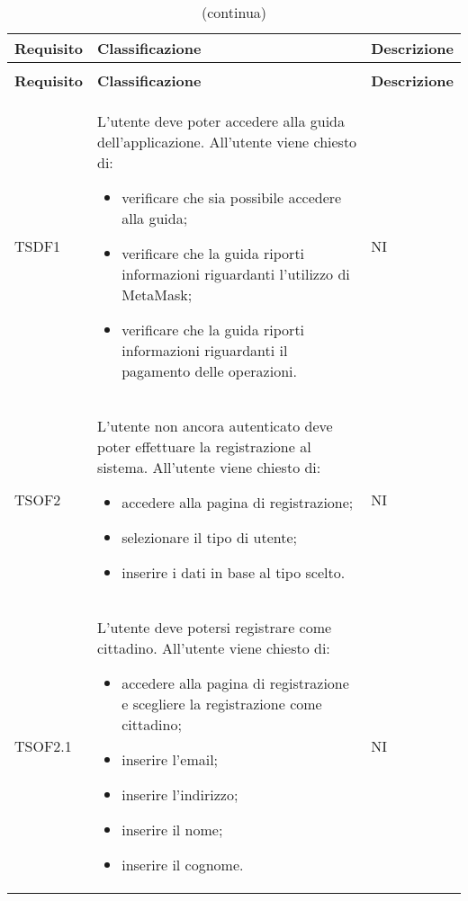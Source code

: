 	\begin{longtable}{ >{\centering}p{} >{\centering}p{}
			>{\centering}p{}}%
			
		\caption{Riepilogo Test di Accettazione}\\	
		\rowcolorhead
		\textbf{\color{white}Requisito} 
		& \textbf{\color{white}Classificazione} 
		& \centering\textbf{\color{white}Descrizione}
		\tabularnewline %
		\endfirsthead	
		
		\rowcolor{white}\caption[]{(continua)}\\	
		\rowcolorhead
		\textbf{\color{white}Requisito} 
		& \textbf{\color{white}Classificazione} 
		& \centering\textbf{\color{white}Descrizione}
		\tabularnewline %
		\endhead	
		
		 TSDF1	&	L'utente deve poter accedere alla guida dell'applicazione. All'utente viene
		chiesto di:
		\begin{itemize}
			\item verificare che sia possibile accedere alla guida;
			\item verificare che la guida riporti informazioni riguardanti l'utilizzo di
			MetaMask\glo{};
			\item verificare che la guida riporti informazioni riguardanti il pagamento
			delle operazioni. 
		\end{itemize}	&	NI
		\tabularnewline
		
		 TSOF2	&	L'utente non ancora autenticato deve poter effettuare la registrazione al
		sistema. All'utente viene chiesto di:
		\begin{itemize}
			\item accedere alla pagina di registrazione;
			\item selezionare il tipo di utente;
			\item inserire i dati in base al tipo scelto.
		\end{itemize}	&	NI
		\tabularnewline
		
		 TSOF2.1	&	L'utente deve potersi registrare come cittadino. All'utente viene chiesto di:
		\begin{itemize}
			\item accedere alla pagina di registrazione e scegliere la registrazione
			come cittadino;
			\item inserire l'email;
			\item inserire l'indirizzo;
			\item inserire il nome;
			\item inserire il cognome.
		\end{itemize}	&	NI
		\tabularnewline
		

\end{longtable}
